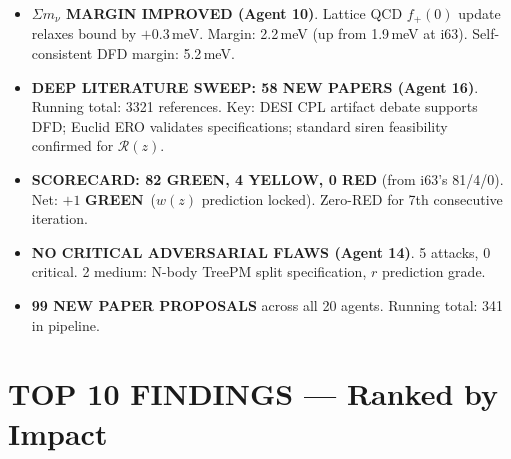\documentclass[11pt,a4paper]{article}
\newcommand{\GREEN}{\textcolor{dfdgreen}{\textbf{GREEN}}}
\newcommand{\YELLOW}{\textcolor{dfdyellow}{\textbf{YELLOW}}}
\newcommand{\RED}{\textcolor{dfdred}{\textbf{RED}}}
\begin{document}
\begin{itemize}
\item \textbf{$\Sigma m_\nu$ MARGIN IMPROVED (Agent 10)}. Lattice QCD $f_+(0)$ update relaxes bound by $+0.3$\,meV. Margin: 2.2\,meV (up from 1.9\,meV at i63). Self-consistent DFD margin: 5.2\,meV.

\item \textbf{DEEP LITERATURE SWEEP: 58 NEW PAPERS (Agent 16)}. Running total: 3321 references. Key: DESI CPL artifact debate supports DFD; Euclid ERO validates specifications; standard siren feasibility confirmed for $\mathcal{R}(z)$.

\item \textbf{SCORECARD: 82 \GREEN, 4 \YELLOW, 0 \RED} (from i63's 81/4/0). Net: $+1$ \GREEN\ ($w(z)$ prediction locked). Zero-RED for 7th consecutive iteration.

\item \textbf{NO CRITICAL ADVERSARIAL FLAWS (Agent 14)}. 5 attacks, 0 critical. 2 medium: N-body TreePM split specification, $r$ prediction grade.

\item \textbf{99 NEW PAPER PROPOSALS} across all 20 agents. Running total: 341 in pipeline.
\end{itemize}


\section{TOP 10 FINDINGS --- Ranked by Impact}
\label{sec:top10}
\end{document}
